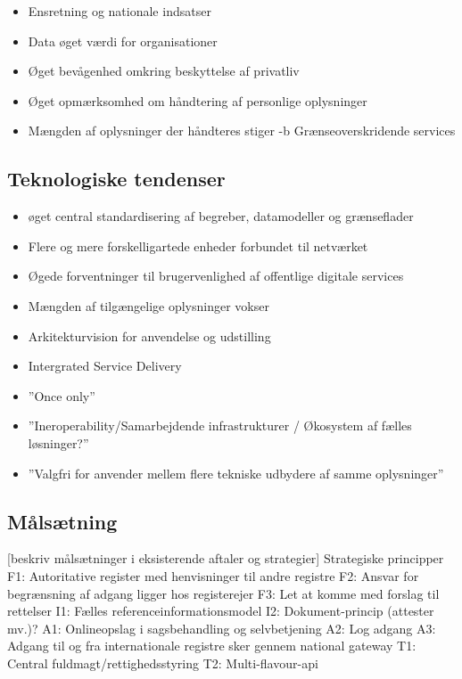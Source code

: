 \begin{itemize}
\tightlist
\item
  Ensretning og nationale indsatser
\item
  Data øget værdi for organisationer
\item
  Øget bevågenhed omkring beskyttelse af privatliv
\item
  Øget opmærksomhed om håndtering af personlige oplysninger
\item
  Mængden af oplysninger der håndteres stiger -b Grænseoverskridende
  services
\end{itemize}

\subsection{Teknologiske tendenser}\label{teknologiske-tendenser}

\begin{itemize}
\tightlist
\item
  øget central standardisering af begreber, datamodeller og grænseflader
\item
  Flere og mere forskelligartede enheder forbundet til netværket
\item
  Øgede forventninger til brugervenlighed af offentlige digitale
  services
\item
  Mængden af tilgængelige oplysninger vokser
\item
  Arkitekturvision for anvendelse og udstilling
\item
  Intergrated Service Delivery
\item
  ''Once only''
\item
  ''Ineroperability/Samarbejdende infrastrukturer / Økosystem af fælles
  løsninger?''
\item
  ''Valgfri for anvender mellem flere tekniske udbydere af samme
  oplysninger''
\end{itemize}

\subsection{Målsætning}\label{muxe5lsuxe6tning}

{[}beskriv målsætninger i eksisterende aftaler og strategier{]}
Strategiske principper F1: Autoritative register med henvisninger til
andre registre F2: Ansvar for begrænsning af adgang ligger hos
registerejer F3: Let at komme med forslag til rettelser I1: Fælles
referenceinformationsmodel I2: Dokument-princip (attester mv.)? A1:
Onlineopslag i sagsbehandling og selvbetjening A2: Log adgang A3: Adgang
til og fra internationale registre sker gennem national gateway T1:
Central fuldmagt/rettighedsstyring T2: Multi-flavour-api

